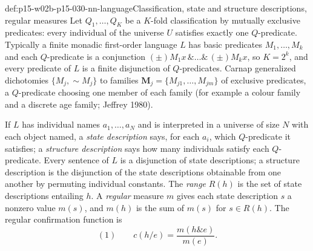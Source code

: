 \begin{hbdefinition}{def:p15-w02b-p15-030-nn-language}{Classification, state and structure descriptions, regular measures}
Let \(Q_1,\ldots,Q_K\) be a \(K\)-fold classification by mutually
exclusive predicates: every individual of the universe \(U\) satisfies
exactly one \(Q\)-predicate. Typically a finite monadic first-order
language \(L\) has basic predicates \(M_1,\ldots,M_k\) and each
\(Q\)-predicate is a conjunction \((\pm)M_1x\,\&\ldots\&\,(\pm)M_kx\), so
\(K=2^k\), and every predicate of \(L\) is a finite disjunction of
\(Q\)-predicates. Carnap generalized dichotomies \(\{M_j,\sim M_j\}\) to
families \(\mathbf M_j=\{M_{j1},\ldots,M_{jm}\}\) of exclusive
predicates, a \(Q\)-predicate choosing one member of each family (for
example a colour family and a discrete age family; Jeffrey 1980).

If \(L\) has individual names \(a_1,\ldots,a_N\) and is interpreted in a
universe of size \(N\) with each object named, a \emph{state
description} says, for each \(a_i\), which \(Q\)-predicate it satisfies;
a \emph{structure description} says how many individuals satisfy each
\(Q\)-predicate. Every sentence of \(L\) is a disjunction of state
descriptions; a structure description is the disjunction of the state
descriptions obtainable from one another by permuting individual
constants. The \emph{range} \(R(h)\) is the set of state descriptions
entailing \(h\). A \emph{regular} measure \(m\) gives each state
description \(s\) a nonzero value \(m(s)\), and \(m(h)\) is the sum of
\(m(s)\) for \(s\in R(h)\). The regular confirmation function is
\[
 (1)\qquad c(h/e)=\frac{m(h\&e)}{m(e)}.
\]
\cite[pp.~315--316]{Niiniluoto2011HintikkaProgramReading}
\end{hbdefinition}

